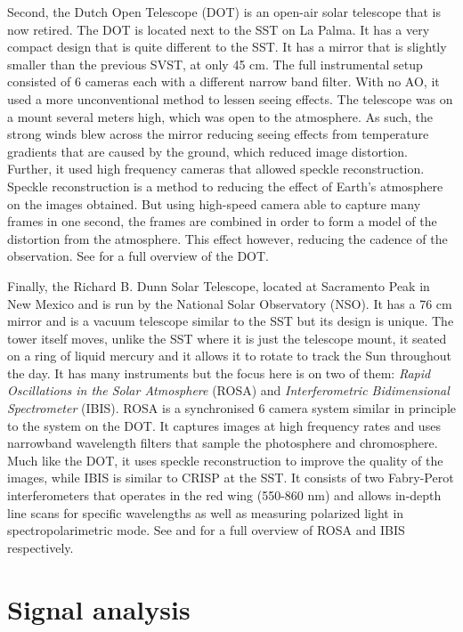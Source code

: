 	Second, the Dutch Open Telescope (DOT) is an open-air solar telescope that is now retired. 
	The DOT is located next to the SST on La Palma.
    It has a very compact design that is quite different to the SST.
    It has a mirror that is slightly smaller than the previous SVST, at only 45 cm.
    The full instrumental setup consisted of 6 cameras each with a different narrow band filter.
	With no AO, it used a more unconventional method to lessen seeing effects.
	The telescope was on a mount several meters high, which was open to the atmosphere.
    As such, the strong winds blew across the mirror reducing seeing effects from temperature gradients that are caused by the ground, which reduced image distortion.
    Further, it used high frequency cameras that allowed speckle reconstruction.
    Speckle reconstruction is a method to reducing the effect of Earth's atmosphere on the images obtained.
    But using high-speed camera able to capture many frames in one second, the frames are combined in order to form a model of the distortion from the atmosphere. 
    This effect however, reducing the cadence of the observation.
    See \cite{rutten} for a full overview of the DOT.
    
	Finally, the Richard B. Dunn Solar Telescope, located at Sacramento Peak in New Mexico and is run by the National Solar Observatory (NSO).
    It has a 76 cm mirror and is a vacuum telescope similar to the SST but its design is unique.
    The tower itself moves, unlike the SST where it is just the telescope mount, it seated on a ring of liquid mercury and it allows it to rotate to track the Sun throughout the day. 
    It has many instruments but the focus here is on two of them: \textit{Rapid Oscillations in the Solar Atmosphere} (ROSA) and \textit{Interferometric Bidimensional Spectrometer} (IBIS).
    ROSA is a synchronised 6 camera system similar in principle to the system on the DOT. 
    It captures images at high frequency rates and uses narrowband wavelength filters that sample the photosphere and chromosphere.
    Much like the DOT, it uses speckle reconstruction to improve the quality of the images, while IBIS is similar to CRISP at the SST.
    It consists of two Fabry-Perot interferometers that operates in the red wing (550-860 nm) and allows in-depth line scans for specific wavelengths as well as measuring polarized light in spectropolarimetric mode.
    See \cite{jess1} and \cite{cavallini2006ibis} for a full overview of ROSA and IBIS respectively.
       
\section{Signal analysis}

